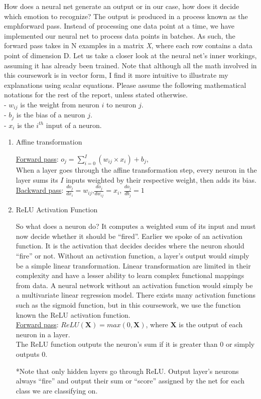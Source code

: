 How does a neural net generate an output or in our case, how does it decide which emotion to recognize?
The output is produced in a process known as the emph{forward pass}.
Instead of processing one data point at a time,
we have implemented our neural net to process data points in batches.
As such, the forward pass takes in N examples in a matrix \emph{X}, where each row contains a data point of dimension D.
Let us take a closer look at the neural net's inner workings, assuming it has already been trained.
Note that although all the math involved in this coursework is in vector form, I find it more intuitive to illustrate my explanations
using scalar equations.
Please assume the following mathematical notations for the rest of the report, unless stated otherwise.\\
\- - $w_{ij}$ is the weight from neuron $i$ to neuron $j$.\\
\- - $b_j$ is the bias of a neuron $j$.\\
\- - $x_i$ is the $i^{th}$ input of a neuron.
\begin{enumerate}
   \item Affine transformation
  
     \underline{Forward pass}: $o_j= \sum\limits_{i=0}^{I} (w_{ij} \times x_{i}) + b_j$, \\
     When a layer goes through the affine transformation step,
     every neuron in the layer sums its $I$ inputs weighted by their respective weight, then adds its bias.\\

     \underline{Backward pass}: $\frac{do_j}{dx_i} = w_{ij}$,\space\space $\frac{do_j}{dw_{ij}} = x_i$, \space\space$\frac{do_j}{db_j} = 1$\\ 
     

   \item ReLU Activation Function
     
     So what does a neuron do? It computes a weighted sum of its input and must now decide whether it should be ``fired''.
     Earlier we spoke of an activation function.
     It is the activation that decides decides where the neuron should ``fire'' or not.
     Without an activation function, a layer's output would simply be a simple linear transformation.
     Linear transformation are limited in their complexity and have a lesser ability to learn complex functional mappings from data.
     A neural network without an activation function would simply be a multivariate linear regression model.
     There exists many activation functions such as the sigmoid function,
     but in this coursework, we use the function known the ReLU activation function.\\
     \underline{Forward pass}: $ReLU(\textbf{X}) = max(0,\textbf{X})$, where $\textbf{X}$ is the output of each neuron in a layer.\\
     The ReLU function outputs the neuron's sum if it is greater than 0 or simply outputs 0.
     
     *Note that only hidden layers go through ReLU.
     Output layer's neurons always ``fire'' and output their sum or ``score'' assigned by the net for each class we are classifying on.
     
\end{enumerate}
